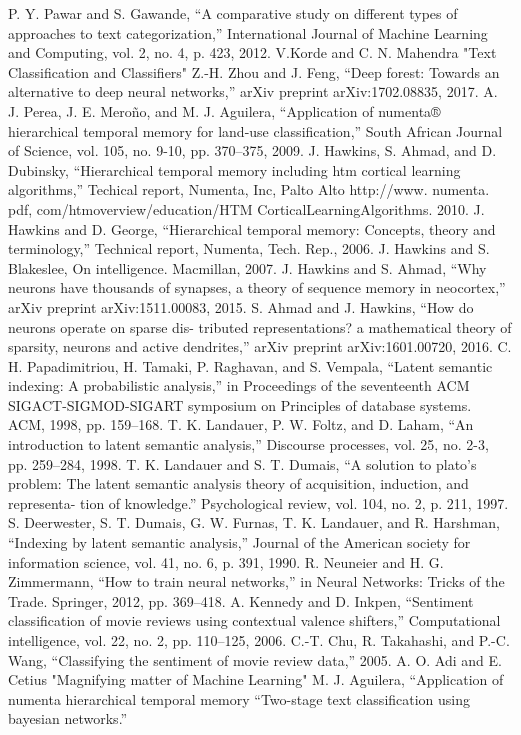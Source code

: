 \documentclass[12pt]{article}
\begin{document}
\begin{multicols}{2}
\begin{thebibliography}{00}
 P. Y. Pawar and S. Gawande, “A comparative study on different types
of approaches to text categorization,” International Journal of Machine
Learning and Computing, vol. 2, no. 4, p. 423, 2012.
 V.Korde and C. N. Mahendra "Text Classification and Classifiers"
 Z.-H. Zhou and J. Feng, “Deep forest: Towards an alternative to deep
neural networks,” arXiv preprint arXiv:1702.08835, 2017.
 A. J. Perea, J. E. Meroño, and M. J. Aguilera, “Application of numenta®
hierarchical temporal memory for land-use classification,” South African
Journal of Science, vol. 105, no. 9-10, pp. 370–375, 2009.
 J. Hawkins, S. Ahmad, and D. Dubinsky, “Hierarchical
temporal memory including htm cortical learning algorithms,”
Techical report, Numenta, Inc, Palto Alto http://www. numenta.
pdf,
com/htmoverview/education/HTM CorticalLearningAlgorithms.
2010.
 J. Hawkins and D. George, “Hierarchical temporal memory: Concepts,
theory and terminology,” Technical report, Numenta, Tech. Rep., 2006.
 J. Hawkins and S. Blakeslee, On intelligence. Macmillan, 2007.
 J. Hawkins and S. Ahmad, “Why neurons have thousands of
synapses, a theory of sequence memory in neocortex,” arXiv preprint
arXiv:1511.00083, 2015.
 S. Ahmad and J. Hawkins, “How do neurons operate on sparse dis-
tributed representations? a mathematical theory of sparsity, neurons and
active dendrites,” arXiv preprint arXiv:1601.00720, 2016.
 C. H. Papadimitriou, H. Tamaki, P. Raghavan, and S. Vempala, “Latent
semantic indexing: A probabilistic analysis,” in Proceedings of the
seventeenth ACM SIGACT-SIGMOD-SIGART symposium on Principles
of database systems. ACM, 1998, pp. 159–168.
 T. K. Landauer, P. W. Foltz, and D. Laham, “An introduction to latent
semantic analysis,” Discourse processes, vol. 25, no. 2-3, pp. 259–284,
1998.
 T. K. Landauer and S. T. Dumais, “A solution to plato’s problem: The
latent semantic analysis theory of acquisition, induction, and representa-
tion of knowledge.” Psychological review, vol. 104, no. 2, p. 211, 1997.
 S. Deerwester, S. T. Dumais, G. W. Furnas, T. K. Landauer, and
R. Harshman, “Indexing by latent semantic analysis,” Journal of the
American society for information science, vol. 41, no. 6, p. 391, 1990.
 R. Neuneier and H. G. Zimmermann, “How to train neural networks,”
in Neural Networks: Tricks of the Trade. Springer, 2012, pp. 369–418.
 A. Kennedy and D. Inkpen, “Sentiment classification of movie reviews
using contextual valence shifters,” Computational intelligence, vol. 22,
no. 2, pp. 110–125, 2006.
 C.-T. Chu, R. Takahashi, and P.-C. Wang, “Classifying the sentiment of
movie review data,” 2005.
 A. O. Adi and E. Cetius "Magnifying matter of Machine Learning"
 M. J. Aguilera, “Application of numenta hierarchical temporal memory
 “Two-stage text classification using bayesian networks.”
\end{thebibliography}
\end{multicols}
\end{document}
